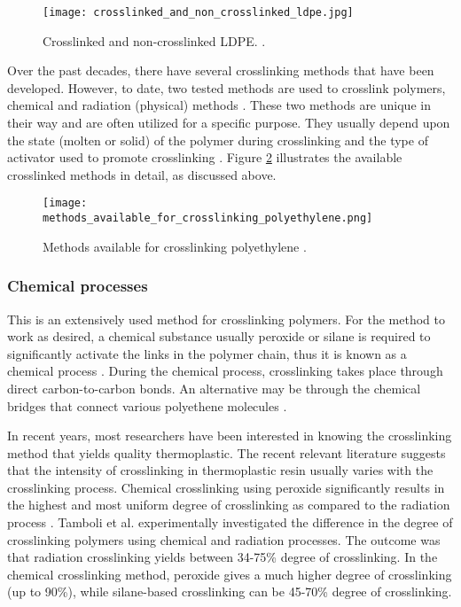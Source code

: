 \begin{figure}[H]
    \centering
    \texttt{[image: crosslinked\_and\_non\_crosslinked\_ldpe.jpg]}
    \caption{Crosslinked and non-crosslinked LDPE. \cite{kurtz2009cross}.}
    \label{ch3:figure:ldpe}
\end{figure}

Over the past decades, there have several crosslinking methods that have been developed. However, to date, two tested methods are used to crosslink polymers, chemical and radiation (physical) methods \cite{clemens2017microstructure, bajaj2020steels}. These two methods are unique in their way and are often utilized for a specific purpose. They usually depend upon the state (molten or solid) of the polymer during crosslinking and the type of activator used to promote crosslinking \cite{kurtz2009cross}. Figure \ref{ch3:figure:crosslinking_methods} illustrates the available crosslinked methods in detail, as discussed above.

\begin{figure}[H]
    \centering
    \texttt{[image: methods\_available\_for\_crosslinking\_polyethylene.png]}
    \caption{Methods available for crosslinking polyethylene \cite{patterson2022cross}.}
    \label{ch3:figure:crosslinking_methods}
\end{figure}

\subsubsection{Chemical processes}
This is an extensively used method for crosslinking polymers. For the method to work as desired, a chemical substance usually peroxide or silane is required to significantly activate the links in the polymer chain, thus it is known as a chemical process \cite{peacock2000handbook}. During the chemical process, crosslinking takes place through direct carbon-to-carbon bonds. An alternative may be through the chemical bridges that connect various polyethene molecules \cite{kurtz2009cross}. 

In recent years, most researchers have been interested in knowing the crosslinking method that yields quality thermoplastic. The recent relevant literature suggests that the intensity of crosslinking in thermoplastic resin usually varies with the crosslinking process. Chemical crosslinking using peroxide significantly results in the highest and most uniform degree of crosslinking as compared to the radiation process \cite{clemens2017microstructure, bajaj2020steels}. Tamboli et al. \cite{peacock2000handbook} experimentally investigated the difference in the degree of crosslinking polymers using chemical and radiation processes. The outcome was that radiation crosslinking yields between 34-75\% degree of crosslinking. In the chemical crosslinking method, peroxide gives a much higher degree of crosslinking (up to 90\%), while silane-based crosslinking can be 45-70\% degree of crosslinking.

